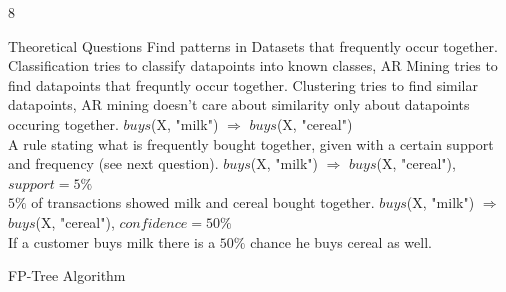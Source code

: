 \documentclass{article}
\begin{document}
    \begin{ukon-infie}[10.01.18]{8}

        \begin{exercise}[p=3]{Theoretical Questions}  
        \question{}
        {
        	Find patterns in Datasets that frequently occur together.
        }
    	\question{}
    	{
    		Classification tries to classify datapoints into known classes, AR Mining tries to find datapoints that frequntly occur together.
    	}
    	\question{}
    	{
    		Clustering tries to find similar datapoints, AR mining doesn't care about similarity only about datapoints occuring together.
    	}
    	\question{}
    	{
			$buys$(X, "milk") $\Rightarrow$ $buys$(X, "cereal") \\
			A rule stating what is frequently bought together, given with a certain support and frequency (see next question).   	
    	}
    	\question{}
    	{
			$buys$(X, "milk") $\Rightarrow$ $buys$(X, "cereal"), $support=5\%$\\ $5\%$ of transactions showed milk and cereal bought together.
    	}
    	\question{}
    	{
			$buys$(X, "milk") $\Rightarrow$ $buys$(X, "cereal"), $confidence=50\%$\\
			If a customer buys milk there is a $50\%$ chance he buys cereal as well.   	
    	}
    	

		\end{exercise}
		
		\begin{exercise}[p=2+2+1+1]{FP-Tree Algorithm}
		\question{}{

}
\end{exercise}
\end{ukon-infie}
\end{document}
